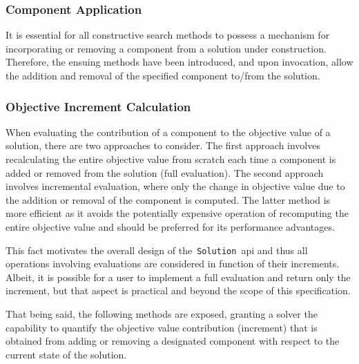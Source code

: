 \begin{center}

\end{center}

\subsubsection*{Component Application}

It is essential for all constructive search methods to possess a mechanism for
incorporating or removing a component from a solution under construction.
Therefore, the ensuing methods have been introduced, and upon invocation, allow
the addition and removal of the specified component to/from the solution.

\begin{center}

\end{center}

\subsubsection*{Objective Increment Calculation}

When evaluating the contribution of a component to the objective value of a
solution, there are two approaches to consider. The first approach involves
recalculating the entire objective value from scratch each time a component is
added or removed from the solution (full evaluation). The second approach
involves incremental evaluation, where only the change in objective value due to
the addition or removal of the component is computed. The latter method is
more efficient as it avoids the potentially expensive operation of recomputing
the entire objective value and should be preferred for its performance advantages.

This fact motivates the overall design of the~\texttt{Solution}~\acrshort{api}
and thus all operations involving evaluations are considered in function of
their increments. Albeit, it is possible for a user to implement
a full evaluation and return only the increment, but that aspect is
practical and beyond the scope of this specification.

That being said, the following methods are exposed, granting a solver the
capability to quantify the objective value contribution (increment) that is
obtained from adding or removing a designated component with respect to the
current state of the solution.

